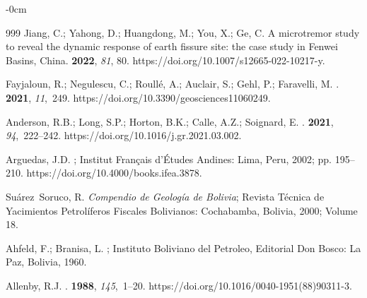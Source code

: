 \documentclass[data,article,accept,pdftex,moreauthors]{Definitions/mdpi}
\begin{document}
{\begin{adjustwidth}{-\extralength}{0cm}
\begin{thebibliography}{999}
Jiang, C.; Yahong, D.; Huangdong, M.; You, X.; Ge, C. {A microtremor study to reveal the dynamic response of earth fissure site: the case study in Fenwei Basins, China}.
 {\bf 2022}, {\em 81}, 80.
https://doi.org/10.1007/s12665-022-10217-y.

Fayjaloun, R.; Negulescu, C.; Roullé, A.; Auclair, S.; Gehl, P.; Faravelli, M.
.
 {\bf 2021}, {\em 11},~249.
https://doi.org/10.3390/geosciences11060249.

Anderson, R.B.; Long, S.P.; Horton, B.K.; Calle, A.Z.; Soignard, E.
.
 {\bf 2021}, {\em 94},~222--242.
https://doi.org/10.1016/j.gr.2021.03.002.

Arguedas, J.D.
; Institut Français d'\'Etudes Andines: Lima, Peru, 2002; pp. 195--210.
https://doi.org/10.4000/books.ifea.3878.


Suárez~Soruco, R. \emph{Compendio de Geología de Bolivia}; Revista Técnica de Yacimientos Petrolíferos Fiscales Bolivianos: Cochabamba, Bolivia, 2000; Volume 18. %

Ahfeld, F.; Branisa, L.
; Instituto Boliviano del Petroleo,
 Editorial Don Bosco: La Paz, Bolivia, 1960.

Allenby, R.J.
.
 {\bf 1988}, {\em 145},~1--20.
https://doi.org/10.1016/0040-1951(88)90311-3.


\end{thebibliography}
\end{adjustwidth}}
\end{document}
